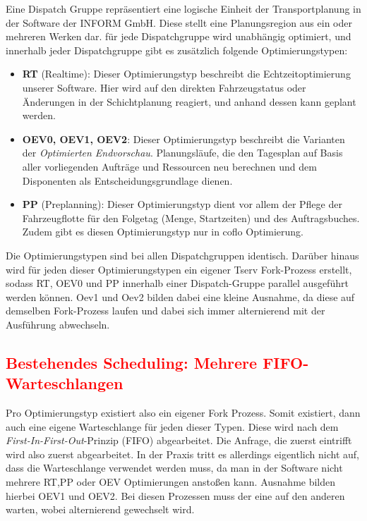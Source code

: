 Eine Dispatch Gruppe repräsentiert eine logische Einheit der Transportplanung in der Software der INFORM GmbH. Diese stellt eine Planungsregion aus ein oder mehreren Werken dar. für jede Dispatchgruppe wird unabhängig optimiert, und innerhalb jeder Dispatchgruppe gibt es zusätzlich folgende Optimierungstypen:

\begin{itemize}
    \item \textbf{RT} (Realtime): Dieser Optimierungstyp beschreibt die Echtzeitoptimierung unserer Software. Hier wird auf den direkten Fahrzeugstatus oder Änderungen in der Schichtplanung reagiert, und anhand dessen kann geplant werden. 
    \item \textbf{OEV0, OEV1, OEV2}: Dieser Optimierungstyp beschreibt die Varianten der \textit{Optimierten Endvorschau}. Planungsläufe, die den Tagesplan auf Basis aller vorliegenden Aufträge und Ressourcen neu berechnen und dem Disponenten als Entscheidungsgrundlage dienen.
    \item \textbf{PP} (Preplanning):  Dieser Optimierungstyp dient vor allem der Pflege der Fahrzeugflotte für den Folgetag (Menge, Startzeiten) und des Auftragsbuches. Zudem gibt es diesen Optimierungstyp nur in coflo Optimierung.
\end{itemize}

Die Optimierungstypen sind bei allen Dispatchgruppen identisch. Darüber hinaus wird für jeden dieser Optimierungstypen ein eigener Tserv Fork-Prozess erstellt, sodass RT, OEV0 und PP innerhalb einer Dispatch-Gruppe parallel ausgeführt werden können. Oev1 und Oev2 bilden dabei eine kleine Ausnahme, da diese auf demselben Fork-Prozess laufen und dabei sich immer alternierend mit der Ausführung abwechseln. 

\subsection{\textcolor{red}{Bestehendes Scheduling: Mehrere FIFO-Warteschlangen}}
Pro Optimierungstyp existiert also ein eigener Fork Prozess. Somit existiert, dann auch eine eigene Warteschlange für jeden dieser Typen. Diese wird nach dem \textit{First-In-First-Out}-Prinzip (FIFO) abgearbeitet. Die Anfrage, die zuerst eintrifft wird also zuerst abgearbeitet. In der Praxis tritt es allerdings eigentlich nicht auf, dass die Warteschlange verwendet werden muss, da man in der Software nicht mehrere RT,PP oder OEV Optimierungen anstoßen kann. Ausnahme bilden hierbei OEV1 und OEV2. Bei diesen Prozessen muss der eine auf den anderen warten, wobei alternierend gewechselt wird. 


